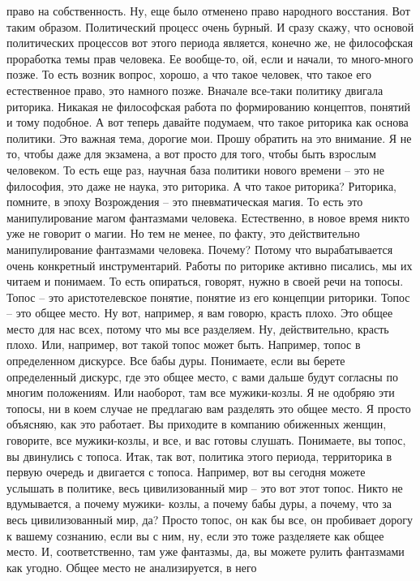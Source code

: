 право на собственность. Ну, еще было отменено право народного восстания. Вот
таким образом. Политический процесс очень бурный. И сразу скажу, что основой
политических процессов вот этого периода является, конечно же, не философская
проработка темы прав человека. Ее вообще-то, ой, если и начали, то много-много
позже. То есть возник вопрос, хорошо, а что такое человек, что такое его
естественное право, это намного позже. Вначале все-таки политику двигала
риторика. Никакая не философская работа по формированию концептов, понятий и
тому подобное. А вот теперь давайте подумаем, что такое риторика как основа
политики. Это важная тема, дорогие мои. Прошу обратить на это внимание. Я не то,
чтобы даже для экзамена, а вот просто для того, чтобы быть взрослым человеком.
То есть еще раз, научная база политики нового времени – это не философия, это
даже не наука, это риторика. А что такое риторика? Риторика, помните, в эпоху
Возрождения – это пневматическая магия. То есть это манипулирование магом
фантазмами человека. Естественно, в новое время никто уже не говорит о магии. Но
тем не менее, по факту, это действительно манипулирование фантазмами человека.
Почему? Потому что вырабатывается очень конкретный инструментарий. Работы по
риторике активно писались, мы их читаем и понимаем. То есть опираться, говорят,
нужно в своей речи на топосы. Топос – это аристотелевское понятие, понятие из
его концепции риторики. Топос – это общее место. Ну вот, например, я вам говорю,
красть плохо. Это общее место для нас всех, потому что мы все разделяем. Ну,
действительно, красть плохо. Или, например, вот такой топос может быть.
Например, топос в определенном дискурсе. Все бабы дуры. Понимаете, если вы
берете определенный дискурс, где это общее место, с вами дальше будут согласны
по многим положениям. Или наоборот, там все мужики-козлы. Я не одобряю эти
топосы, ни в коем случае не предлагаю вам разделять это общее место. Я просто
объясняю, как это работает. Вы приходите в компанию обиженных женщин, говорите,
все мужики-козлы, и все, и вас готовы слушать. Понимаете, вы топос, вы двинулись
с топоса. Итак, так вот, политика этого периода, территорика в первую очередь и
двигается с топоса. Например, вот вы сегодня можете услышать в политике, весь
цивилизованный мир – это вот этот топос. Никто не вдумывается, а почему мужики-
козлы, а почему бабы дуры, а почему, что за весь цивилизованный мир, да? Просто
топос, он как бы все, он пробивает дорогу к вашему сознанию, если вы с ним, ну,
если это тоже разделяете как общее место. И, соответственно, там уже фантазмы,
да, вы можете рулить фантазмами как угодно. Общее место не анализируется, в него
